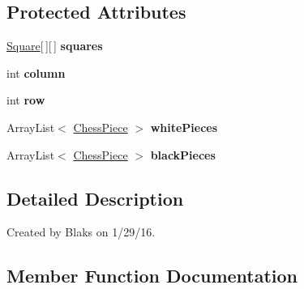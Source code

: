 \subsection*{Protected Attributes}
\begin{DoxyCompactItemize}
\item 
\hyperlink{class_board_and_game_1_1_square}{Square}\mbox{[}$\,$\mbox{]}\mbox{[}$\,$\mbox{]} {\bfseries squares}\hypertarget{class_board_and_game_1_1_board_adf1bbfe988dc243bb6989ae574ee8c2c}{}\label{class_board_and_game_1_1_board_adf1bbfe988dc243bb6989ae574ee8c2c}

\item 
int {\bfseries column}\hypertarget{class_board_and_game_1_1_board_adb554a7959da1c68ee659ad4b9a87bef}{}\label{class_board_and_game_1_1_board_adb554a7959da1c68ee659ad4b9a87bef}

\item 
int {\bfseries row}\hypertarget{class_board_and_game_1_1_board_a1a812ca2e5aba395e1da106f8a3506d7}{}\label{class_board_and_game_1_1_board_a1a812ca2e5aba395e1da106f8a3506d7}

\item 
Array\+List$<$ \hyperlink{class_chess_pieces_1_1_chess_piece}{Chess\+Piece} $>$ {\bfseries white\+Pieces}\hypertarget{class_board_and_game_1_1_board_a8fc6425a96cb7bfb711557557e606db1}{}\label{class_board_and_game_1_1_board_a8fc6425a96cb7bfb711557557e606db1}

\item 
Array\+List$<$ \hyperlink{class_chess_pieces_1_1_chess_piece}{Chess\+Piece} $>$ {\bfseries black\+Pieces}\hypertarget{class_board_and_game_1_1_board_a227b297e707f685da921b58ecf60d509}{}\label{class_board_and_game_1_1_board_a227b297e707f685da921b58ecf60d509}

\end{DoxyCompactItemize}


\subsection{Detailed Description}
Created by Blaks on 1/29/16. 

\subsection{Member Function Documentation}
